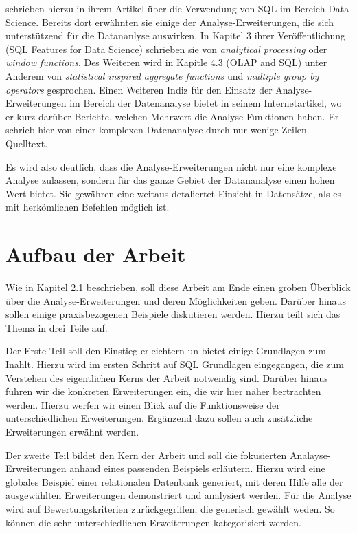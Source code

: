 \cite{FOTACHE2015243} schrieben hierzu in ihrem Artikel über die Verwendung von SQL im
Bereich Data Science. Bereits dort erwähnten sie einige der Analyse-Erweiterungen,
die sich unterstützend für die Datananlyse auswirken. In Kapitel 3 ihrer
Veröffentlichung (SQL Features for Data Science) schrieben sie von
\textit{analytical processing} oder \textit{window functions}. Des Weiteren wird
in Kapitle 4.3 (OLAP and SQL) unter Anderem von
\textit{statistical inspired aggregate functions} und
\textit{multiple group by operators} gesprochen. Einen Weiteren Indiz für den 
Einsatz der Analyse-Erweiterungen im Bereich der Datenanalyse bietet \cite{Maue2022}
in seinem Internetartikel, wo er kurz darüber Berichte, welchen Mehrwert die
Analyse-Funktionen haben. Er schrieb hier von einer komplexen Datenanalyse durch
nur wenige Zeilen Quelltext.

Es wird also deutlich, dass die Analyse-Erweiterungen nicht nur eine komplexe
Analyse zulassen, sondern für das ganze Gebiet der Datananalyse einen hohen Wert bietet.
Sie gewähren eine weitaus detaliertet Einsicht in Datensätze, als es mit
herkömlichen Befehlen möglich ist.


\section{Aufbau der Arbeit}
Wie in Kapitel 2.1 beschrieben, soll diese Arbeit am Ende einen groben Überblick
über die Analyse-Erweiterungen und deren Möglichkeiten geben.
Darüber hinaus sollen einige praxisbezogenen Beispiele diskutieren werden.
Hierzu teilt sich das Thema in drei Teile auf.

Der Erste Teil soll den Einstieg erleichtern un bietet einige Grundlagen zum Inahlt.
Hierzu wird im ersten Schritt auf SQL Grundlagen eingegangen, die zum Verstehen
des eigentlichen Kerns der Arbeit notwendig sind. Darüber hinaus führen wir die
konkreten Erweiterungen ein, die wir hier näher bertrachten werden. Hierzu
werfen wir einen Blick auf die Funktionsweise der unterschiedlichen Erweiterungen.
Ergänzend dazu sollen auch zusätzliche Erweiterungen erwähnt werden.

Der zweite Teil bildet den Kern der Arbeit und soll die fokusierten Analayse-
Erweiterungen anhand eines passenden Beispiels erläutern. Hierzu wird eine globales
Beispiel einer relationalen Datenbank generiert, mit deren Hilfe alle der
ausgewählten Erweiterungen demonstriert und analysiert werden. Für
die Analyse wird auf Bewertungskriterien zurückgegriffen, die generisch gewählt
weden. So können die sehr unterschiedlichen Erweiterungen kategorisiert werden.

